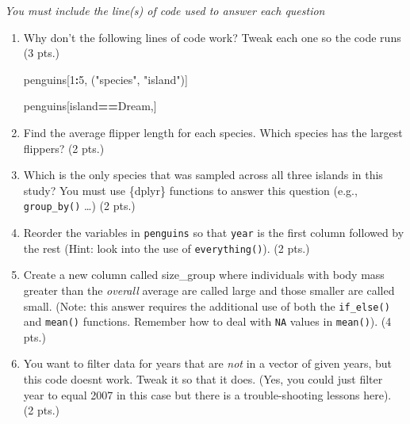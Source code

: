 \documentclass[
]{book}
\newenvironment{Shaded}{\begin{snugshade}}{\end{snugshade}}
\newcommand{\DecValTok}[1]{\textcolor[rgb]{0.00,0.00,0.81}{#1}}
\newcommand{\NormalTok}[1]{#1}
\newcommand{\SpecialCharTok}[1]{\textcolor[rgb]{0.81,0.36,0.00}{\textbf{#1}}}
\newcommand{\StringTok}[1]{\textcolor[rgb]{0.31,0.60,0.02}{#1}}
\begin{document}
\emph{You must include the line(s) of code used to answer each question}

\begin{enumerate}
\def\labelenumi{\arabic{enumi}.}
\item
  Why don't the following lines of code work? Tweak each one so the code runs (3 pts.)

\begin{Shaded}
\begin{Highlighting}[]
\NormalTok{penguins[}\DecValTok{1}\SpecialCharTok{:}\DecValTok{5}\NormalTok{, (}\StringTok{"species"}\NormalTok{, }\StringTok{"island"}\NormalTok{)]}
\end{Highlighting}
\end{Shaded}

\begin{Shaded}
\end{Shaded}

\begin{Shaded}
\begin{Highlighting}[]
\NormalTok{penguins[island}\SpecialCharTok{==}\StringTok{\textquotesingle{}Dream\textquotesingle{}}\NormalTok{,]}
\end{Highlighting}
\end{Shaded}
\item
  Find the average flipper length for each species. Which species has the largest flippers? (2 pts.)
\item
  Which is the only species that was sampled across all three islands in this study? You must use \{dplyr\} functions to answer this question (e.g., \texttt{group\_by()} \ldots) (2 pts.)
\item
  Reorder the variables in \texttt{penguins} so that \texttt{year} is the first column followed by the rest (Hint: look into the use of \texttt{everything()}). (2 pts.)
\item
  Create a new column called \textquotesingle size\_group\textquotesingle{} where individuals with body mass greater than the \emph{overall} average are called \textquotesingle large\textquotesingle{} and those smaller are called \textquotesingle small\textquotesingle. (Note: this answer requires the additional use of both the \texttt{if\_else()} and \texttt{mean()} functions. Remember how to deal with \texttt{NA} values in \texttt{mean()}). (4 pts.)
\item
  You want to filter data for years that are \emph{not} in a vector of given years, but this code doesn\textquotesingle t work. Tweak it so that it does. (Yes, you could just filter year to equal 2007 in this case but there is a trouble-shooting lessons here). (2 pts.)


\end{enumerate}
\end{document}
